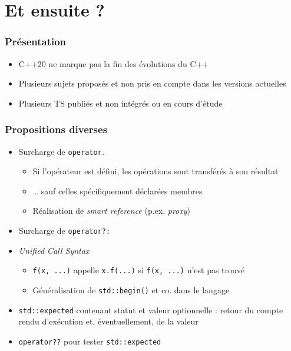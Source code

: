 \documentclass[C++.tex]{subfiles}
\begin{document}
\section{Et ensuite ?}

\begin{frame}
	\frametitle{Présentation}
	\begin{itemize}
		\item C++20 ne marque pas la fin des évolutions du C++
		\item Plusieurs sujets proposés et non pris en compte dans les versions actuelles
		\item Plusieurs TS publiés et non intégrés ou en cours d'étude
	\end{itemize}
\end{frame}

\begin{frame}
	\frametitle{Propositions diverses}
	\begin{itemize}
		\item Surcharge de \lstinline|operator.|
		\begin{itemize}
			\item Si l'opérateur est défini, les opérations sont transférés à son résultat
			\item \ldots{} sauf celles spécifiquement déclarées membres
			\item Réalisation de \textit{smart reference} (p.ex. \textit{proxy})
		\end{itemize}
		\item Surcharge de \lstinline|operator?:|
		\item \textit{Unified Call Syntax}
		\begin{itemize}
			\item \lstinline|f(x, ...)| appelle \lstinline|x.f(...)| si \lstinline|f(x, ...)| n'est pas trouvé
			\item Généralisation de \lstinline|std::begin()| et co. dans le langage
		\end{itemize}
		\item \lstinline|std::expected| contenant statut et valeur optionnelle : retour du compte rendu d'exécution et, éventuellement, de la valeur
		\item \lstinline|operator??| pour tester \lstinline|std::expected|



\end{itemize}
\end{frame}
\end{document}
